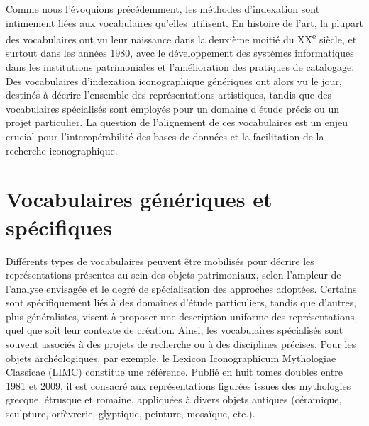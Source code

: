 Comme nous l'évoquions précédemment, les méthodes d'indexation sont intimement liées aux vocabulaires qu’elles utilisent. En histoire de l'art, la plupart des vocabulaires ont vu leur naissance dans la deuxième moitié du XX\textsuperscript{e} siècle, et surtout dans les années 1980, avec le développement des systèmes informatiques dans les institutions patrimoniales et l’amélioration des pratiques de catalogage. Des vocabulaires d’indexation iconographique génériques ont alors vu le jour, destinés à décrire l’ensemble des représentations artistiques, tandis que des vocabulaires spécialisés sont employés pour un domaine d’étude précis ou un projet particulier. La question de l'alignement de ces vocabulaires est un enjeu crucial pour l'interopérabilité des bases de données et la facilitation de la recherche iconographique.

\section{Vocabulaires génériques et spécifiques}

Différents types de vocabulaires peuvent être mobilisés pour décrire les représentations présentes au sein des objets patrimoniaux, selon l’ampleur de l’analyse envisagée et le degré de spécialisation des approches adoptées. Certains sont spécifiquement liés à des domaines d’étude particuliers, tandis que d’autres, plus généralistes, visent à proposer une description uniforme des représentations, quel que soit leur contexte de création.
Ainsi, les vocabulaires spécialisés sont souvent associés à des projets de recherche ou à des disciplines précises. Pour les objets archéologiques, par exemple, le Lexicon Iconographicum Mythologiae Classicae (LIMC) constitue une référence. Publié en huit tomes doubles entre 1981 et 2009, il est consacré aux représentations figurées issues des mythologies grecque, étrusque et romaine, appliquées à divers objets antiques (céramique, sculpture, orfèvrerie, glyptique, peinture, mosaïque, etc.)\cite{fondationinternationalepourlelimcLexiconIconographicumMythologiae1981, fondationinternationalepourlelimcLexiconIconographicumMythologiae2009}. 

